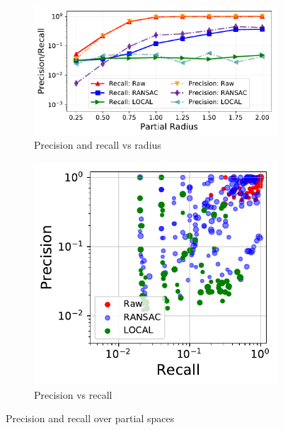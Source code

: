\begin{figure}
	\centering
	\begin{subfigure}[]{0.62\columnwidth}
		\centering
		\includegraphics[width=\textwidth]{figures/plots/precision-recall-vs-radius.pdf}
    	\caption{\centering Precision and recall vs radius}
		\label{fig:precison-recall-radius}
	\end{subfigure}
	\begin{subfigure}[]{0.37\columnwidth}
		\centering
		\includegraphics[width=\textwidth]{figures/plots/precision-vs-recall}
    	\caption{\centering Precision vs recall}
		\label{fig:precison-vs-radius}
	\end{subfigure}
	\caption{Precision and recall over partial spaces}
	\vspace{-2mm}
	\label{fig:performance-analysis}
\end{figure}

